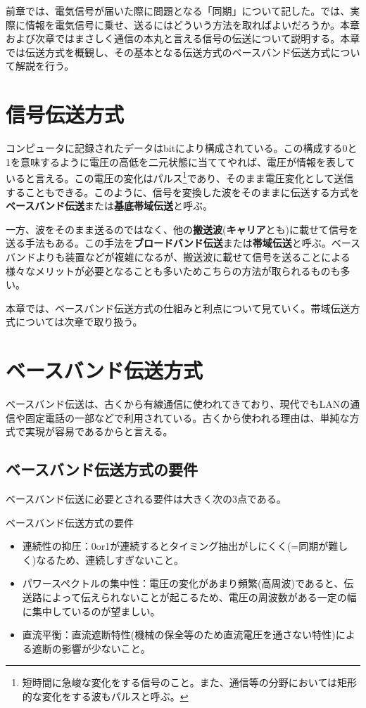 前章では、電気信号が届いた際に問題となる「同期」について記した。では、実際に情報を電気信号に乗せ、送るにはどういう方法を取ればよいだろうか。本章および次章ではまさしく通信の本丸と言える信号の伝送について説明する。本章では伝送方式を概観し、その基本となる伝送方式のベースバンド伝送方式について解説を行う。

\section{信号伝送方式}

コンピュータに記録されたデータはbitにより構成されている。この構成する0と1を意味するように電圧の高低を二元状態に当ててやれば、電圧が情報を表していると言える。この電圧の変化はパルス\footnote{短時間に急峻な変化をする信号のこと。また、通信等の分野においては矩形的な変化をする波もパルスと呼ぶ。}であり、そのまま電圧変化として送信することもできる。このように、信号を変換した波をそのままに伝送する方式を\textbf{ベースバンド伝送}または\textbf{基底帯域伝送}と呼ぶ。

一方、波をそのまま送るのではなく、他の\textbf{搬送波}(\textbf{キャリア}とも)に載せて信号を送る手法もある。この手法を\textbf{ブロードバンド伝送}または\textbf{帯域伝送}と呼ぶ。ベースバンドよりも装置などが複雑になるが、搬送波に載せて信号を送ることによる様々なメリットが必要となることも多いためこちらの方法が取られるものも多い。

本章では、ベースバンド伝送方式の仕組みと利点について見ていく。帯域伝送方式については次章で取り扱う。

\section{ベースバンド伝送方式}
ベースバンド伝送は、古くから有線通信に使われてきており、現代でもLANの通信や固定電話の一部などで利用されている。古くから使われる理由は、単純な方式で実現が容易であるからと言える。

\subsection{ベースバンド伝送方式の要件}
ベースバンド伝送に必要とされる要件は大きく次の3点である。

\begin{itembox}[l]{ベースバンド伝送方式の要件}
\begin{itemize}
\item 連続性の抑圧：0or1が連続するとタイミング抽出がしにくく(=同期が難しく)なるため、連続しすぎないこと。
\item パワースペクトルの集中性：電圧の変化があまり頻繁(高周波)であると、伝送路によって伝えられないことが起こるため、電圧の周波数がある一定の幅に集中しているのが望ましい。
\item 直流平衡：直流遮断特性(機械の保全等のため直流電圧を通さない特性)による遮断の影響が少ないこと。
\end{itemize}
\end{itembox}

